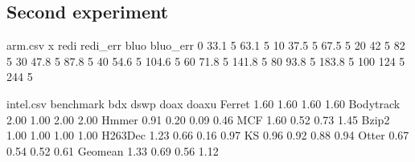 \documentclass[11pt]{article}
\begin{document}
	\newpage
	\subsection{Second experiment}


		\begin{filecontents}{arm.csv}
		x redi redi_err bluo bluo_err 
		0 33.1 5        63.1 5 
		10 37.5 5        67.5 5 
		20 42 5          82 5 
		30 47.8 5        87.8 5 
		40 54.6 5        104.6 5 
		60 71.8 5        141.8 5 
		80 93.8 5        183.8 5 
		100 124 5       244 5 
		\end{filecontents}


		\begin{figure}[!h]


		\end{figure}





	\begin{filecontents}{intel.csv}
	benchmark    	bdx   dswp    doax    doaxu
	Ferret  		1.60 1.60 1.60 1.60
	Bodytrack  		2.00 1.00 2.00 2.00
	Hmmer   		0.91 0.20 0.09 0.46
	MCF    			1.60 0.52 0.73 1.45
	Bzip2   		1.00 1.00 1.00 1.00
	H263Dec   		1.23 0.66 0.16 0.97
	KS   			0.96  0.92     0.88    0.94
	Otter   		0.67  0.54     0.52    0.61
	Geomean     	1.33 0.69 0.56 1.12
	\end{filecontents}
\end{document}
